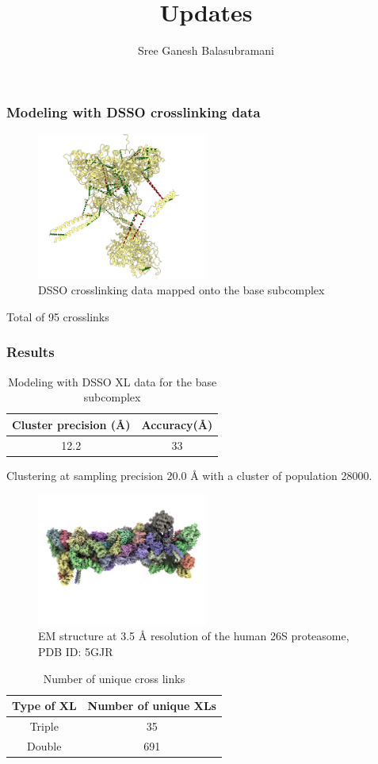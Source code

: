 \documentclass[a4paper,8pt]{beamer}
\title{Updates}
\author[]{Sree Ganesh Balasubramani}
\institute[UCSF]{Echeverria Group, UC San Francisco}
\date{}
\begin{document}
\maketitle
%
\begin{frame}
  \frametitle{Modeling with DSSO crosslinking data}
  \begin{figure}
  \centering
  \includegraphics[width=0.5\textwidth]{figures/dsso-mapped-xls.png}
  \caption{DSSO crosslinking data mapped onto the base subcomplex}
  \end{figure}
  Total of 95 crosslinks
  \end{frame}
%  
\begin{frame}
\frametitle{Results}
\begin{table}
\centering
\caption{Modeling with DSSO XL data for the base subcomplex}
\begin{tabular}{|c|c|}
    \hline
    Cluster precision ({\AA}) & Accuracy({\AA}) \\ \hline
    12.2 & 33 \\ \hline
\end{tabular}
\end{table}
Clustering at sampling precision $20.0$ {\AA} with
a cluster of population 28000. 
\end{frame}
%
\begin{frame}
    \begin{figure}
    \centering
    \includegraphics[width=0.5\textwidth]{figures/5gjr_structure.png}
    \caption{EM structure at 3.5 {\AA} resolution of the human 26S proteasome, PDB ID: 5GJR}
    \end{figure}
\begin{table}
    \centering
    \caption{Number of unique cross links}
    \begin{tabular}{|c|c|}
        \hline
        Type of XL & Number of unique XLs \\ \hline
        Triple & 35 \\ \hline
        Double & 691 \\ \hline
    \end{tabular}
\end{table}
\end{frame}
\end{document}
